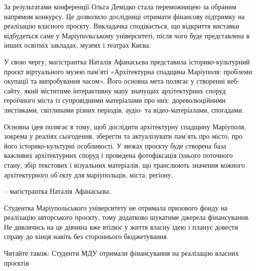 За результатами конференції Ольга Демідко стала переможницею за обраним
напрямом конкурсу. Це дозволило дослідниці отримати фінансову підтримку на
реалізацію власного проєкту. Викладачка сподівається, що відкриття виставки
відбудеться саме у Маріупольському університеті, після чого буде представлена в
інших освітніх закладах, музеях і театрах Києва. 

У свою чергу, магістрантка Наталія Афанасьєва представила історико-культурний
проєкт віртуального музею пам’яті «Архітектурна спадщина Маріуполя: проблеми
окупації та випробування часом». Його основна мета полягає у створенні
веб-сайту, який міститиме інтерактивну мапу значущих архітектурних споруд
героїчного міста із супровідними матеріалами про них: дореволюційними
листівками, світлинами різних періодів, аудіо- та відео-матеріалами, спогадами.

Основна ідея полягає в тому, щоб дослідити архітектурну спадщину Маріуполя,
зокрема у реаліях сьогодення, зберегти та актуалізувати пам’ять про місто,
про його історико-культурні особливості. У межах проєкту буде створена база
важливих архітектурних споруд і проведена фотофіксація їхнього поточного
стану, збір текстових і візуальних матеріалів, що транслюють значення
кожного архітектурного об’єкту для маріупольців, міста, регіону,

– магістрантка Наталія Афанасьєва.

Студентка Маріупольського університету не отримала призового фонду на
реалізацію авторського проєкту, тому додатково шукатиме джерела фінансування.
Не дивлячись на це дівчина вже втілює у життя власну ідею і планує довести
справу до кінця навіть без стороннього бюджетування. 

Читайте також: Студенти МДУ отримали фінансування на реалізацію власних проєктів
